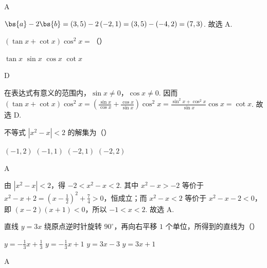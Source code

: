 \begin{answer}
A
\end{answer}

\begin{solution}
\(\bs{a}-2\bs{b}=\left(3,5\right)-2\left(-2,1\right)=\left(3,5\right)-\left(-4,2\right)=\left(7,3\right)\). 故选 A.
\end{solution}

\begin{problem}
\((\tan x + \cot x)\cos^{2}x =\)（\quad）

\choices
    {\(\tan x\)}
    {\(\sin x\)}
    {\(\cos x\)}
    {\(\cot x\)}
\end{problem}

\begin{answer}
D
\end{answer}

\begin{solution}
在表达式有意义的范围内，\(\sin x\ne0\)，\(\cos x\ne0\). 因而
\((\tan x+\cot x)\cos^{2}x=\left(\frac{\sin x}{\cos x}+\frac{\cos x}{\sin x}\right)\cos^{2}x=\frac{\sin^{2}x+\cos^{2}x}{\sin x}\cos x=\cot x\). 故选 D.
\end{solution}

\begin{problem}
不等式 \(|x^{2} - x| < 2\) 的解集为（\quad）

\choices
    {\((-1, 2)\)}
    {\((-1, 1)\)}
    {\((-2, 1)\)}
    {\((-2, 2)\)}
\end{problem}

\begin{answer}
A
\end{answer}

\begin{solution}
由 \(\left\lvert x^{2}-x\right\rvert<2\)，得 \(-2<x^{2}-x<2\). 其中
\(x^{2}-x>-2\) 等价于 \(x^{2}-x+2=\left(x-\frac12\right)^{2}+\frac74>0\)，恒成立；而 \(x^{2}-x<2\) 等价于 \(x^{2}-x-2<0\)，即 \((x-2)(x+1)<0\)，所以 \(-1<x<2\). 故选 A.
\end{solution}

\begin{problem}
直线 \(y = 3x\) 绕原点逆时针旋转 \(90^{\circ}\)，再向右平移 \(1\) 个单位，所得到的直线为（\quad）

\choices
    {\(y = -\frac{1}{3}x + \frac{1}{3}\)}
    {\(y = -\frac{1}{3}x + 1\)}
    {\(y = 3x - 3\)}
    {\(y = 3x + 1\)}
\end{problem}

\begin{answer}
A
\end{answer}

